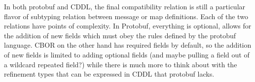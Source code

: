 \documentclass[11pt]{article}
\theoremstyle{definition}
\theoremstyle{plain}
\begin{document}
In both protobuf and CDDL, the final compatibility relation is still a
particular flavor of subtyping relation between message or map definitions. Each
of the two relations have points of complexity. In Protobuf, everything is
optional, allows for the addition of new fields which must obey the rules
defined by the protobuf language. CBOR on the other hand has required fields by
default, so the addition of new fields is limited to adding optional fields (and
maybe pulling a field out of a wildcard repeated field?) while there is much
more to think about with the refinement types that can be expressed in CDDL that
protobuf lacks.

\printbibliography{}
\end{document}
